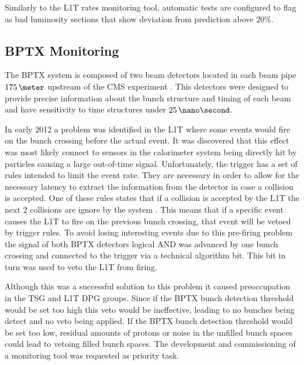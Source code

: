 Similarly to the \gls{L1T} rates monitoring tool, automatic tests are configured to flag as bad luminosity sections that show deviation from prediction above 20\%. 

\subsection{BPTX Monitoring}


The \acrfull{BPTX} system is composed of two beam detectors located in each beam pipe $175\,\meter$ upstream of the \gls{CMS} experiment \cite{ARTICLE:TheCMSExperiment}. This detectors were designed to provide precise information about the bunch structure and timing of each beam and have sensitivity to time structures under $25\,\nano\second$. 

In early 2012 a problem was identified in the \gls{L1T} where some events would fire on the bunch crossing before the actual event. It was discovered that this effect was most likely connect to sensors in the calorimeter system being directly hit by particles causing a large out-of-time signal. Unfortunately, the trigger has a set of rules intended to limit the event rate. They are necessary in order to allow for the necessary latency to extract the information from the detector in case a collision is accepted. One of these rules states that if a collision is accepted by the \gls{L1T} the next 2 collisions are ignore by the system \cite{CMSTDR:CMSTridasTDRVol1}. This means that if a specific event causes the \gls{L1T} to fire on the previous bunch crossing, that event will be vetoed by trigger rules. To avoid losing interesting events due to this pre-firing problem the signal of both \gls{BPTX} detectors logical AND was advanced by one bunch crossing and connected to the trigger via a technical algorithm bit. This bit in turn was used to veto the \gls{L1T} from firing.

Although this was a successful solution to this problem it caused preoccupation in the \gls{TSG} and \gls{L1T} \gls{DPG} groups. Since if the \gls{BPTX} bunch detection threshold would be set too high this veto would be ineffective, leading to no bunches being detect and no veto being applied. If the \gls{BPTX} bunch detection threshold would be set too low, residual amounts of protons or noise in the unfilled bunch spaces could lead to vetoing filled bunch spaces. The development and commissioning of a monitoring tool was requested as priority task.

